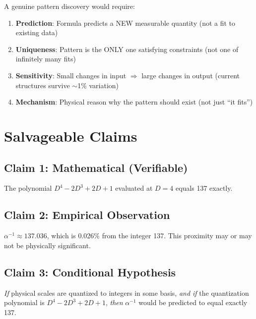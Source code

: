 \documentclass[11pt,a4paper]{article}
\begin{document}
A genuine pattern discovery would require:

\begin{enumerate}
    \item \textbf{Prediction}: Formula predicts a NEW measurable quantity (not a fit to existing data)
    
    \item \textbf{Uniqueness}: Pattern is the ONLY one satisfying constraints (not one of infinitely many fits)
    
    \item \textbf{Sensitivity}: Small changes in input $\Rightarrow$ large changes in output (current structures survive $\sim$1\% variation)
    
    \item \textbf{Mechanism}: Physical reason why the pattern should exist (not just ``it fits'')
\end{enumerate}

\section{Salvageable Claims}

\subsection{Claim 1: Mathematical (Verifiable)}

The polynomial $D^4 - 2D^3 + 2D + 1$ evaluated at $D=4$ equals 137 exactly.

\subsection{Claim 2: Empirical Observation}

$\alpha^{-1} \approx 137.036$, which is 0.026\% from the integer 137. This proximity may or may not be physically significant.

\subsection{Claim 3: Conditional Hypothesis}

\textit{If} physical scales are quantized to integers in some basis, \textit{and if} the quantization polynomial is $D^4 - 2D^3 + 2D + 1$, \textit{then} $\alpha^{-1}$ would be predicted to equal exactly 137.
\end{document}
